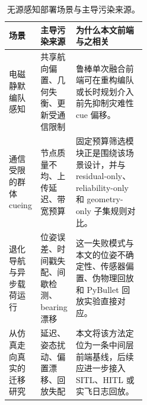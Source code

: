 \begin{table}[!htbp]
\centering
\caption{无源感知部署场景与主导污染来源。}
\label{tab:deploymain}
\small
\setlength{\tabcolsep}{4pt}
\begin{tabularx}{\linewidth}{>{\RaggedRight\arraybackslash}p{0.23\linewidth} >{\RaggedRight\arraybackslash}p{0.23\linewidth} X}
\toprule
场景 & 主导污染来源 & 为什么本文前端与之相关 \\
\midrule
电磁静默编队感知 \cite{li2025bearing,huang2025emcompat} & 共享航向偏置、几何失衡、更新受通信限制 & 鲁棒单次融合前端可在重构编队或长时规划介入前先抑制灾难性 cue 偏移。 \\
通信受限的群体 cueing \cite{xing2025node,zhou2026target} & 节点质量不均、上传延迟、带宽预算 & 固定预算筛选模块正是围绕该场景设计，并与 residual-only、reliability-only 和 geometry-only 子集规则对比。 \\
退化导航与异步载荷运行 \cite{chen2025research,peng2024trajectory} & 位姿误差、时间戳失配、间歇检测、bearing 漂移 & 这一失败模式与本文的位姿不确定性、传感器偏置、伪物理回放和 PyBullet 回放实验直接对应。 \\
从仿真走向真实的迁移研究 \cite{panerati2021learning,perezsegui2023bridging} & 延迟、姿态扰动、偏置漂移、回放失配 & 本文将该方法定位为一条中间层前端基线，后续应进一步接入 SITL、HITL 或实飞日志回放。 \\
\bottomrule
\end{tabularx}
\end{table}

